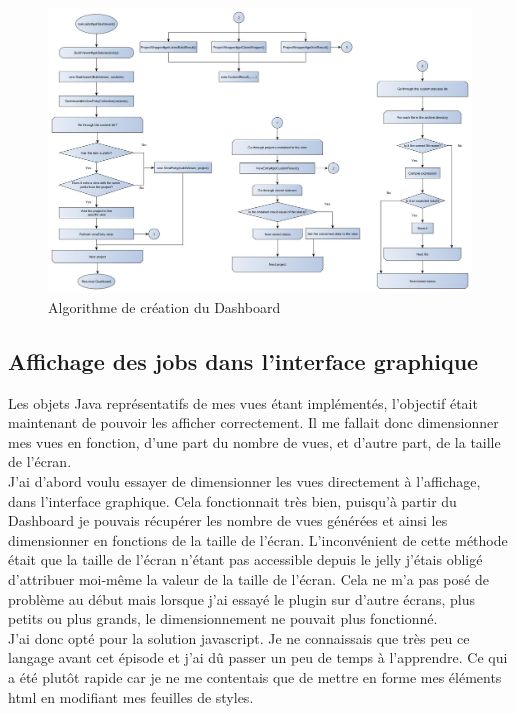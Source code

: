 \begin{figure}[H]
  \centering
      \includegraphics[width=\textheight,angle=90]{images/dashboardGenesis.jpg}
  \caption{Algorithme de création du Dashboard}
	\label{figure:dashboardGenesis}
\end{figure}


\subsection{Affichage des jobs dans l'interface graphique}

Les objets \gls{Java} représentatifs de mes vues étant implémentés, l'objectif était maintenant de pouvoir les afficher correctement. Il me fallait donc dimensionner mes vues en fonction, d'une part du nombre de vues, et d'autre part, de la taille de l'écran.\\
J'ai d'abord voulu essayer de dimensionner les vues directement à l'affichage, dans l'interface graphique. Cela fonctionnait très bien, puisqu'à partir du Dashboard je pouvais récupérer les nombre de vues générées et ainsi les dimensionner en fonctions de la taille de l'écran. L'inconvénient de cette méthode était que la taille de l'écran n'étant pas accessible depuis le jelly j'étais obligé d'attribuer moi-même la valeur de la taille de l'écran. Cela ne m'a pas posé de problème au début mais lorsque j'ai essayé le plugin sur d'autre écrans, plus petits ou plus grands, le dimensionnement ne pouvait plus fonctionné.\\
J'ai donc opté pour la solution javascript. Je ne connaissais que très peu ce langage avant cet épisode et j'ai dû passer un peu de temps à l'apprendre. Ce qui a été plutôt rapide car je ne me contentais que de mettre en forme mes éléments html en modifiant mes feuilles de styles.\\

